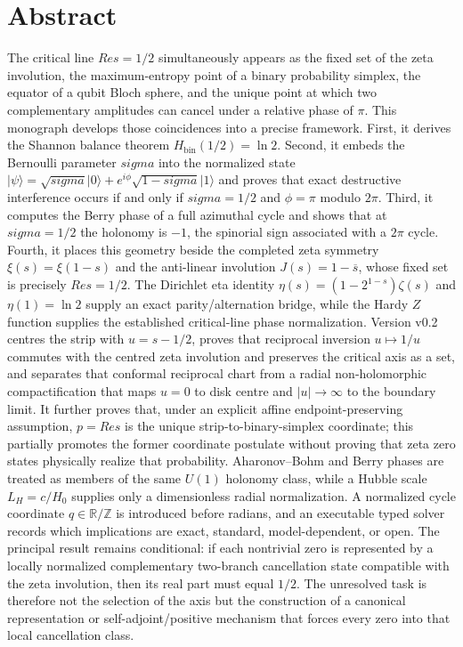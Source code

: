 \documentclass[11pt,oneside]{book}
\theoremstyle{remark}
\newcommand{\Ree}{\operatorname{Re}}
\newcommand{\Hbin}{H_{\mathrm{bin}}}
\newcommand{\ket}[1]{\lvert #1\rangle}
\def\Ree{Re}%
\def\sigma{sigma}%
\begin{document}
\chapter*{Abstract}
The critical line $\Ree s=1/2$ simultaneously appears as the fixed set of the zeta involution, the maximum-entropy point of a binary probability simplex, the equator of a qubit Bloch sphere, and the unique point at which two complementary amplitudes can cancel under a relative phase of $\pi$. This monograph develops those coincidences into a precise framework. First, it derives the Shannon balance theorem $\Hbin(1/2)=\ln 2$. Second, it embeds the Bernoulli parameter $\sigma$ into the normalized state $\ket{\psi}=\sqrt{\sigma}\ket{0}+e^{i\phi}\sqrt{1-\sigma}\ket{1}$ and proves that exact destructive interference occurs if and only if $\sigma=1/2$ and $\phi=\pi$ modulo $2\pi$. Third, it computes the Berry phase of a full azimuthal cycle and shows that at $\sigma=1/2$ the holonomy is $-1$, the spinorial sign associated with a $2\pi$ cycle. Fourth, it places this geometry beside the completed zeta symmetry $\xi(s)=\xi(1-s)$ and the anti-linear involution $J(s)=1-\overline{s}$, whose fixed set is precisely $\Ree s=1/2$. The Dirichlet eta identity $\eta(s)=(1-2^{1-s})\zeta(s)$ and $\eta(1)=\ln2$ supply an exact parity/alternation bridge, while the Hardy $Z$ function supplies the established critical-line phase normalization. Version v0.2 centres the strip with $u=s-1/2$, proves that reciprocal inversion $u\mapsto1/u$ commutes with the centred zeta involution and preserves the critical axis as a set, and separates that conformal reciprocal chart from a radial non-holomorphic compactification that maps $u=0$ to disk centre and $|u|\to\infty$ to the boundary limit. It further proves that, under an explicit affine endpoint-preserving assumption, $p=\Ree s$ is the unique strip-to-binary-simplex coordinate; this partially promotes the former coordinate postulate without proving that zeta zero states physically realize that probability. Aharonov--Bohm and Berry phases are treated as members of the same $U(1)$ holonomy class, while a Hubble scale $L_H=c/H_0$ supplies only a dimensionless radial normalization. A normalized cycle coordinate $q\in\mathbb R/\mathbb Z$ is introduced before radians, and an executable typed solver records which implications are exact, standard, model-dependent, or open. The principal result remains conditional: if each nontrivial zero is represented by a locally normalized complementary two-branch cancellation state compatible with the zeta involution, then its real part must equal $1/2$. The unresolved task is therefore not the selection of the axis but the construction of a canonical representation or self-adjoint/positive mechanism that forces every zero into that local cancellation class.
\end{document}
